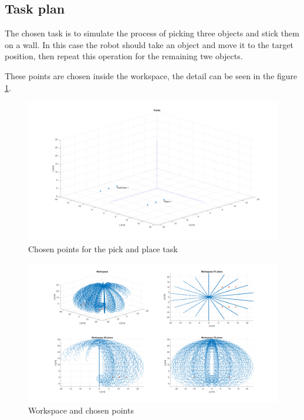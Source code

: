 \documentclass{article}
\begin{document}
\subsection{Task plan}
The chosen task is to simulate the process of picking three objects and stick them on a wall. In this case the robot should take an object and move it to the target position, then repeat this operation for the remaining twe objects.

These points are chosen inside the workspace, the detail can be seen in the figure \ref{fig:points.points}.

\begin{figure}
\begin{center}
\includegraphics[width=\textwidth]{images/Points}
\caption{Chosen points for the pick and place task}
\label{fig:points.points}
\end{center}
\end{figure}

\begin{figure}
\begin{center}
\includegraphics[width=\textwidth]{images/Workspace_Points}
\caption{Workspace and chosen points}
\label{fig:points.ws_points}
\end{center}
\end{figure}
\end{document}
